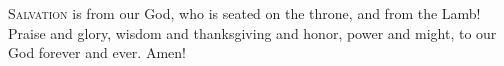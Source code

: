 
\lettrine{S}{alvation} is from our God, who is seated on the throne, and from the Lamb! Praise and glory, wisdom and thanksgiving and honor, power and might, to our God forever and ever. Amen!